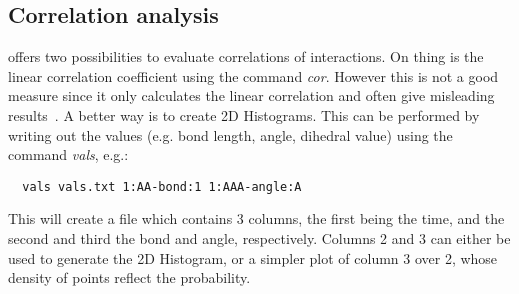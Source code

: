 \subsection{Correlation analysis}
 offers two possibilities to evaluate correlations of interactions. On thing is the linear correlation coefficient using the command \textit{cor}. However this is not a good measure since it only calculates the linear correlation and often give misleading results~\cite{Ruehle:2009.a}. A better way is to create 2D Histograms. This can be performed by writing out the values (e.g. bond length, angle, dihedral value) using the command \textit{vals}, e.g.:
\begin{verbatim}
  vals vals.txt 1:AA-bond:1 1:AAA-angle:A
\end{verbatim}
This will create a file which contains 3 columns, the first being the time, and the second and third the bond and angle, respectively. Columns 2 and 3 can either be used to generate the 2D Histogram, or a simpler plot of column 3 over 2, whose density of points reflect the probability.
